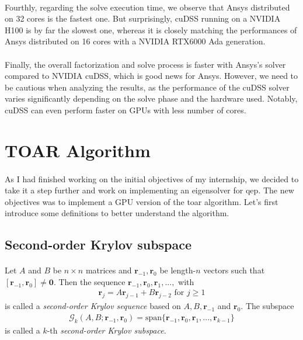 \paragraph*{}
Fourthly, regarding the solve execution time, we observe that Ansys distributed on 32 cores is the fastest one. But surprisingly, cuDSS running on a NVIDIA H100 is by far the slowest one, whereas it is closely matching the performances of Ansys distributed on 16 cores with a NVIDIA RTX6000 Ada generation.

\paragraph*{}
Finally, the overall factorization and solve process is faster with Ansys's solver compared to NVIDIA cuDSS, which is good news for Ansys. However, we need to be cautious when analyzing the results, as the performance of the cuDSS solver varies significantly depending on the solve phase and the hardware used. Notably, cuDSS can even perform faster on GPUs with less number of cores.


\newpage
\section{TOAR Algorithm}

\paragraph*{}
As I had finished working on the initial objectives of my internship, we decided to take it a step further and work on implementing an eigensolver for \acrfull{qep}. The new objectives was to implement a GPU version of the \acrfull{toar} algorithm. Let's first introduce some definitions to better understand the algorithm.


\subsection{Second-order Krylov subspace}
\paragraph*{}
Let $A$ and $B$ be $n\times n$ matrices and $\mathbf{r}_{-1}, \mathbf{r}_0$ be length-$n$ vectors such that $[\mathbf{r}_{-1}, \mathbf{r}_0] \neq \mathbf{0}$. Then the sequence $\mathbf{r}_{-1}, \mathbf{r}_{0}, \mathbf{r}_{1},...,$ with
\begin{align}
    \mathbf{r}_{j} = A\mathbf{r}_{j-1} + B\mathbf{r}_{j-2} \text{ for } j\geq 1
\end{align}
is called a \textit{second-order Krylov sequence} based on $A, B, \mathbf{r}_{-1}$ and $\mathbf{r}_{0}$. The subspace
\begin{align}
    \mathcal{G}_k(A,B;\mathbf{r}_{-1},\mathbf{r}_{0}) = \text{span}\{\mathbf{r}_{-1}, \mathbf{r}_{0}, \mathbf{r}_{1},...,\mathbf{r}_{k-1} \}
\end{align}
is called a $k$-th \textit{second-order Krylov subspace}.

